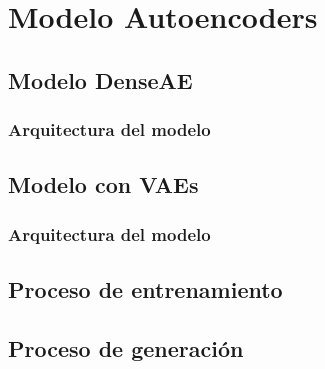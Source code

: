 \chapter{Modelo Autoencoders}\label{chapter:Models}

\section{Modelo DenseAE}
\subsection{Arquitectura del modelo}

\section{Modelo con VAEs}
\subsection{Arquitectura del modelo}

\section{Proceso de entrenamiento}

\section{Proceso de generación}



